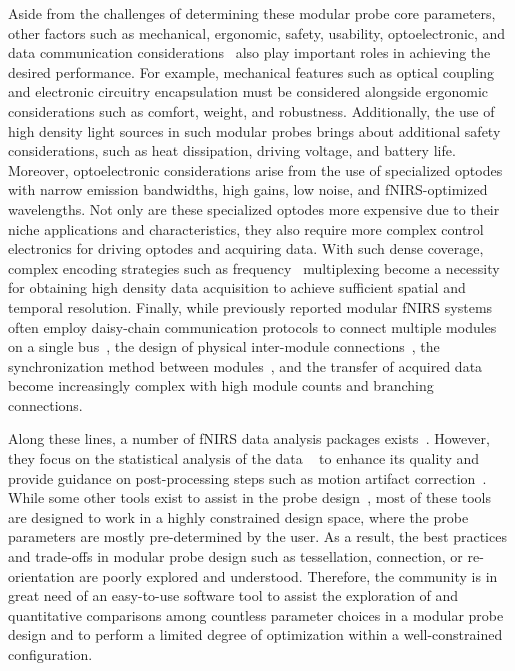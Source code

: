 Aside from the challenges of determining these modular probe core parameters, other factors such as mechanical, ergonomic, safety, usability, optoelectronic, and data communication considerations~\cite{Zhao2017} also play important roles in achieving the desired performance. For example, mechanical features such as optical coupling and electronic circuitry encapsulation must be considered alongside ergonomic considerations such as comfort, weight, and robustness. Additionally, the use of high density light sources in such modular probes brings about additional safety considerations, such as heat dissipation, driving voltage, and battery life. Moreover, optoelectronic considerations arise from the use of specialized optodes with narrow emission bandwidths, high gains, low noise, and fNIRS-optimized wavelengths. Not only are these specialized optodes more expensive due to their niche applications and characteristics, they also require more complex control electronics for driving optodes and acquiring data. With such dense coverage, complex encoding strategies such as frequency~\cite{Maki1995} multiplexing become a necessity for obtaining high density data acquisition to achieve sufficient spatial and temporal resolution. Finally, while previously reported modular fNIRS systems often employ daisy-chain communication protocols to connect multiple modules on a single bus~\cite{Chitnis2016, Bci2017, Zimmermann2013, Funane2017, Zhao2019}, the design of physical inter-module connections~\cite{Zhao2021}, the synchronization method between modules~\cite{Zhao2017}, and the transfer of acquired data become increasingly complex with high module counts and branching connections.

Along these lines, a number of fNIRS data analysis packages exists~\cite{Huppert2009, Santosa2018, Hernandez2020}. However, they focus on the statistical analysis of the data ~\cite{Hernandez2020,Huppert2009, Santosa2018} to enhance its quality and provide guidance on post-processing steps such as motion artifact correction~\cite{Huppert2009}. While some other tools exist to assist in the probe design~\cite{Brigadoi2018, Machado2018, ZimeoMorais2018, Aasted2015}, most of these tools are designed to work in a highly constrained design space, where the probe parameters are mostly pre-determined by the user. As a result, the best practices and trade-offs in modular probe design such as tessellation, connection, or re-orientation are poorly explored and understood. Therefore, the community is in great need of an easy-to-use software tool to assist the exploration of and quantitative comparisons among countless parameter choices in a modular probe design and to perform a limited degree of optimization within a well-constrained configuration. 

